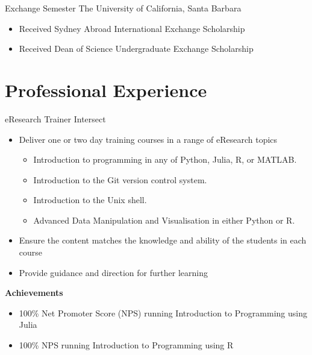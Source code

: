 {Exchange Semester}
{The University of California, Santa Barbara}{}{}
{%
\begin{itemize}
  \item Received Sydney Abroad International Exchange Scholarship
  \item Received Dean of Science Undergraduate Exchange Scholarship
\end{itemize}
}
\vspace{1em}

\nocite{*}
\printbibliography[title={Selected Publications}]

\pagebreak
\section{Professional Experience}

{eResearch Trainer}
{Intersect}{}{}
{%
  \begin{itemize}
    \item Deliver one or two day training courses in a range of eResearch topics
      \begin{itemize}
        \item Introduction to programming in any of Python, Julia, R, or MATLAB.
        \item Introduction to the Git version control system.
        \item Introduction to the Unix shell.
        \item Advanced Data Manipulation and Visualisation in either Python or R.
      \end{itemize}
    \item Ensure the content matches the knowledge and ability of the students in each
      course
    \item Provide guidance and direction for further learning
  \end{itemize}
  \textbf{Achievements}
  \begin{itemize}
    \item 100\% Net Promoter Score (NPS) running Introduction to Programming using Julia
    \item 100\% NPS running Introduction to Programming using R
  \end{itemize}
}
\vspace{1em}

